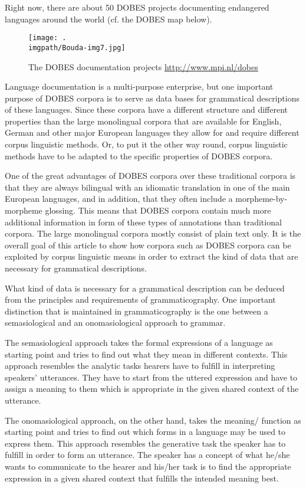 Right now, there are about 50 DOBES projects documenting endangered languages around the world (cf. the DOBES map below).

\begin{figure}
\texttt{[image: .\\imgpath/Bouda-img7.jpg]}
\caption{The DOBES documentation projects \url{http://www.mpi.nl/dobes}}
\end{figure}


Language documentation is a multi-purpose enterprise, but one important purpose of DOBES corpora is to serve as data bases for grammatical descriptions of these languages. Since these corpora have a different structure and different properties than the large monolingual corpora that are available for English, German and other major European languages they allow for and require different corpus linguistic methods. Or, to put it the other way round, corpus linguistic methods have to be adapted to the specific properties of DOBES corpora.

One of the great advantages of DOBES corpora over these traditional corpora is that they are always bilingual with an idiomatic translation in one of the main European languages, and in addition, that they often include a morpheme-by-morpheme glossing. This means that DOBES corpora contain much more additional information in form of these types of annotations than traditional corpora. The large monolingual corpora mostly consist of plain text only. It is the overall goal of this article to show how corpora such as DOBES corpora can be exploited by corpus linguistic means in order to extract the kind of data that are necessary for grammatical descriptions. 

What kind of data is necessary for a grammatical description can be deduced from the principles and requirements of grammaticography. One important distinction that is maintained in grammaticography is the one between a semasiological and an onomasiological approach to grammar. 

The semasiological approach takes the formal expressions of a language as starting point and tries to find out what they mean in different contexts. This approach resembles the analytic tasks hearers have to fulfill in interpreting speakers' utterances. They have to start from the uttered expression and have to assign a meaning to them which is appropriate in the given shared context of the utterance. 

The onomasiological approach, on the other hand, takes the meaning/ function as starting point and tries to find out which forms in a language may be used to express them. This approach resembles the generative task the speaker has to fulfill in order to form an utterance. The speaker has a concept of what he/she wants to communicate to the hearer and his/her task is to find the appropriate expression in a given shared context that fulfills the intended meaning best.

